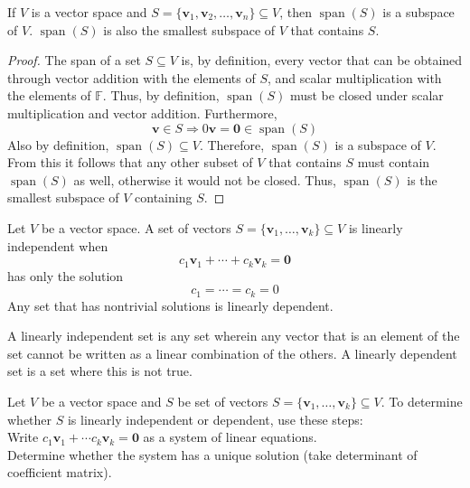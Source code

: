 \begin{theorem}
    If \(V\) is a vector space and \(S=  \{ \mathbf{v} _1,\mathbf{v} _2,\ldots,\mathbf{v} _n \} \subseteq  V \), then \(\operatorname{span}(S) \) is a subspace of \(V\). \(\operatorname{span}(S) \) is also the smallest subspace of \(V\) that contains \(S\).
\end{theorem}
\begin{proof}
    The span of a set \(S \subseteq  V\) is, by definition, every vector that can be obtained through vector addition with the elements of \(S\), and scalar multiplication with the elements of \(\mathbb{F} \). Thus, by definition, \(\operatorname{span}(S) \) must be closed under scalar multiplication and vector addition. Furthermore,
    \[
        \mathbf{v} \in S \Longrightarrow 0 \mathbf{v} =\mathbf{0} \in \operatorname{span}(S) 
    \]
    Also by definition, \(\operatorname{span}(S) \subseteq  V \). Therefore, \(\operatorname{span}(S) \) is a subspace of \(V\). From this it follows that any other subset of \(V\) that contains \(S\) must contain \(\operatorname{span}(S) \) as well, otherwise it would not be closed. Thus, \(\operatorname{span}(S) \) is the smallest subspace of \(V\) containing \(S\).
\end{proof}
\begin{definition}
    Let \(V\) be a vector space. A set of vectors \(S =\{ \mathbf{v} _1,\ldots,\mathbf{v} _k \} \subseteq V\) is linearly independent when 
    \[
        c_1 \mathbf{v} _1+\cdots+c_k \mathbf{v} _k = \mathbf{0} 
    \]
    has only the solution 
    \[
        c_1=\cdots=c_k = 0
    \]
    Any set that has nontrivial solutions is linearly dependent.
\end{definition}
\begin{remark}
    A linearly independent set is any set wherein any vector that is an element of the set cannot be written as a linear combination of the others. A linearly dependent set is a set where this is not true.
\end{remark}
Let \(V\) be a vector space and \(S\) be set of vectors \(S =\{ \mathbf{v} _1,\ldots,\mathbf{v} _k \} \subseteq V\). To determine whether \(S\) is linearly independent or dependent, use these steps:\\
Write \(c_1 \mathbf{v} _1 + \cdots c_k \mathbf{v} _k = \mathbf{0} \) as a system of linear equations.\\
Determine whether the system has a unique solution (take determinant of coefficient matrix).\\
